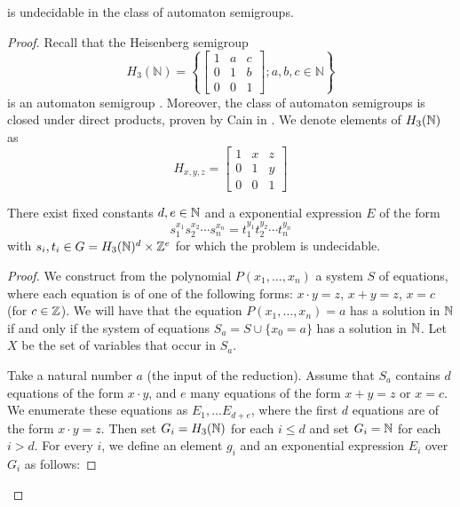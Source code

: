 \documentclass[11pt, titlepage]{article}
\begin{document}
\begin{theorem}
   is undecidable in the class of
  automaton semigroups.
\end{theorem}
\begin{proof}

Recall that the Heisenberg semigroup
\[
  H_3(\mathbb{N}) = \left\{
      \begin{bmatrix}
        1 & a & c \\
        0 & 1 & b \\
        0 & 0 & 1
      \end{bmatrix}; a, b, c \in \mathbb{N}
    \right\}
\]
is an automaton semigroup \cite{Bondarenko:heisenberg}. Moreover, the
class of automaton semigroups is closed under direct products, proven
by Cain in \cite{Cain09:auto_sg}. We denote elements of $H_3(\mathbb{N})$ as
\[
  H_{x,y,z} = 
      \begin{bmatrix}
        1 & x & z \\
        0 & 1 & y \\
        0 & 0 & 1
      \end{bmatrix}
\]

\begin{proposition}
  There exist fixed constants $d,e \in \mathbb{N}$ and a exponential
  expression $E$ of the form
  \[ s_1^{x_1} s_2^{x_2}\cdots s_n^{x_n} = t_1^{y_1} t_2^{y_2}\cdots
    t_n^{y_n} \] with $s_i, t_i \in G = H_3(\mathbb{N})^d \times \mathbb{Z}^e$ for which the
   problem is undecidable.
\end{proposition}

\begin{proof}
  We construct from the polynomial $P(x_1, \ldots, x_n)$ a system $S$
  of equations, where each equation is of one of the following forms:
  $x\cdot y = z$, $x+y = z$, $x = c$ (for $c \in \mathbb{Z}$).  We will have
  that the equation $P(x_1,\ldots, x_n) = a$ has a solution in $\mathbb{N}$ if
  and only if the system of equations $S_a = S \cup \{x_0 = a\}$ has a
  solution in $\mathbb{N}$. Let $X$ be the set of variables that occur in
  $S_a$.

  Take a natural number $a$ (the input of the reduction). Assume that
  $S_a$ contains $d$ equations of the form $x\cdot y$, and $e$ many
  equations of the form $x+y = z$ or $x = c$. We enumerate these
  equations as $E_1, \ldots E_{d+e}$, where the first $d$ equations
  are of the form $x\cdot y = z$. Then set $G_i = H_3(\mathbb{N})$ for each
  $i \leq d$ and set $G_i = \mathbb{N}$ for each $i > d$. For every $i$, we
  define an element $g_i$ and an exponential expression $E_i$ over
  $G_i$ as follows:


\end{proof}
\end{proof}
\end{document}
